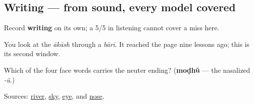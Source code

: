 \subsection*{Writing — from sound, every model covered}
Record \textbf{writing} on its own; a 5/5 in listening cannot cover a miss here.

You look at the \emph{ākāsh} through a \emph{bārī}. It reached the page nine lessons ago; this is its second window.

\begin{tcolorbox}[breakable,colback=teal!4,colframe=teal!35!black,title={Before you move on}]
Which of the four face words carries the neuter ending? (\textbf{moḍhũ} — the nasalized \emph{-ũ}.)

Sources: \href{https://dictionary.cambridge.org/dictionary/english-gujarati/river}{river}, \href{https://dictionary.cambridge.org/dictionary/english-gujarati/sky}{sky}, \href{https://dictionary.cambridge.org/dictionary/english-gujarati/eye}{eye}, and \href{https://dictionary.cambridge.org/dictionary/english-gujarati/nose}{nose}.
\end{tcolorbox}
